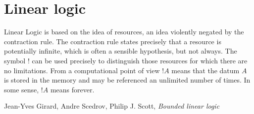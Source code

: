 \documentclass[english,letter paper,12pt,reqno]{article}
\theoremstyle{example}
\numberwithin{equation}{section}
\begin{document}



\section{Linear logic}\label{section:intro_ll}

\setlength{\epigraphwidth}{0.8\textwidth}
\epigraph{Linear Logic is based on the idea of resources, an idea violently negated by the contraction rule. The contraction rule states precisely that a resource is potentially infinite, which is often a sensible hypothesis, but not always. The symbol $!$ can be used precisely to distinguish those resources for which there are no limitations. From a computational point of view $!A$ means that the datum $A$ is stored in the memory and may be referenced an unlimited number of times. In some sense, $!A$ means forever.}
{Jean-Yves Girard, Andre Scedrov, Philip J. Scott, \textit{Bounded linear logic}}
\end{document}
